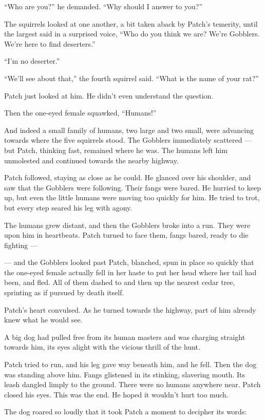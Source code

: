 \documentclass[ebook,oneside,openany,12pt]{memoir}
\begin{document}
“Who are you?” he demanded. “Why should I answer to you?”

The squirrels looked at one another, a bit taken aback by Patch’s
temerity, until the largest said in a surprised voice, “Who do you
think we are? We’re Gobblers. We’re here to find deserters.”

“I’m no deserter.”

“We’ll see about that,” the fourth squirrel said. “What is the name of
your rat?”

Patch just looked at him. He didn’t even understand the question.

Then the one-eyed female squawked, “Humans!”

And indeed a small family of humans, two large and two small, were
advancing towards where the five squirrels stood. The Gobblers
immediately scattered — but Patch, thinking fast, remained where he
was. The humans left him unmolested and continued towards the nearby
highway.

Patch followed, staying as close as he could. He glanced over his
shoulder, and saw that the Gobblers were following. Their fangs were
bared. He hurried to keep up, but even the little humans were moving
too quickly for him. He tried to trot, but every step seared his leg
with agony.

The humans grew distant, and then the Gobblers broke into a run. They
were upon him in heartbeats. Patch turned to face them, fangs bared,
ready to die fighting —

— and the Gobblers looked past Patch, blanched, spun in place so
quickly that the one-eyed female actually fell in her haste to put her
head where her tail had been, and fled. All of them dashed to and then
up the nearest cedar tree, sprinting as if pursued by death itself.

Patch’s heart convulsed. As he turned towards the highway, part of him
already knew what he would see.

A big dog had pulled free from its human masters and was charging
straight towards him, its eyes alight with the vicious thrill of the
hunt.

Patch tried to run, and his leg gave way beneath him, and he
fell. Then the dog was standing above him. Fangs glistened in its
stinking, slavering mouth. Its leash dangled limply to the
ground. There were no humans anywhere near. Patch closed his
eyes. This was the end. He hoped it wouldn’t hurt too much.

The dog roared so loudly that it took Patch a moment to decipher its
words:
\end{document}
